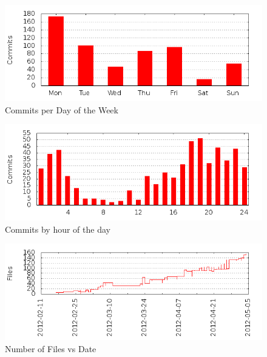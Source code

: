 \documentclass[10pt,letterpaper,final]{report}
\begin{document}
\begin{figure}[h]
  \centering
  \includegraphics{images/day_of_week.png}
  \caption{Commits per Day of the Week}
\end{figure}

\begin{figure}[h]
  \centering
  \includegraphics{images/hour_of_day.png}
  \caption{Commits by hour of the day}
\end{figure}

\begin{figure}[h]
  \centering
  \includegraphics{images/files_by_date.png}
  \caption{Number of Files vs Date}
\end{figure}
\end{document}
